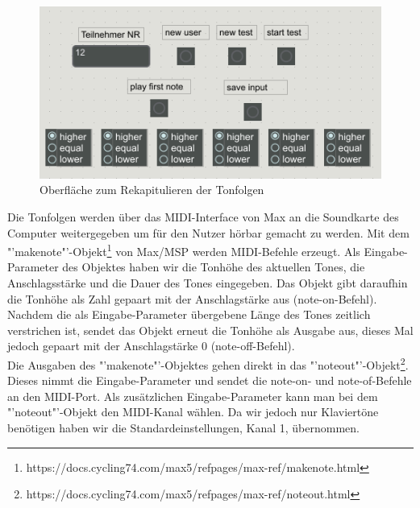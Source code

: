 \documentclass{acm_proc_article-sp}
\begin{document}
\begin{figure}[H]
\includegraphics[width=1.0\linewidth]{Abbildungen/secondstep.png}
\caption{Oberfläche zum Rekapitulieren der Tonfolgen}
\label{maxsecondstep}
\end{figure}

Die Tonfolgen werden über das MIDI-Interface von Max an die Soundkarte des Computer weitergegeben um für den Nutzer hörbar gemacht zu werden. Mit dem "'makenote"'-Objekt\footnote{https://docs.cycling74.com/max5/refpages/max-ref/makenote.html} von Max\slash MSP werden MIDI-Befehle erzeugt. Als Eingabe-Parameter des Objektes haben wir die Tonhöhe des aktuellen Tones, die Anschlagsstärke und die Dauer des Tones  eingegeben. Das Objekt gibt daraufhin die Tonhöhe als Zahl gepaart mit der Anschlagstärke aus (note-on-Befehl). Nachdem die als Eingabe-Parameter übergebene Länge des Tones zeitlich verstrichen ist, sendet das Objekt erneut die Tonhöhe als Ausgabe aus, dieses Mal jedoch gepaart mit der Anschlagstärke 0 (note-off-Befehl).\\
Die Ausgaben des "'makenote"'-Objektes gehen direkt in das "'noteout"'-Objekt\footnote{https://docs.cycling74.com/max5/refpages/max-ref/noteout.html}. Dieses nimmt die Eingabe-Parameter und sendet die note-on- und note-of-Befehle an den MIDI-Port. Als zusätzlichen Eingabe-Parameter kann man bei dem "'noteout"'-Objekt den MIDI-Kanal wählen. Da wir jedoch nur Klaviertöne benötigen haben wir die Standardeinstellungen, Kanal 1, übernommen.
\end{document}
